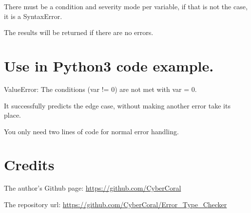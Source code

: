 \documentclass{article}
\begin{document}
 	There must be a condition and severity mode per variable, if that is not the case, it is a SyntaxError.
 	
 	The results will be returned if there are no errors.
 	
 	\newpage
	\section{Use in Python3 code example.}
	
	
	\vspace{3cm}
	\hspace{-0.5cm}ValueError: The conditions (var != 0) are not met with var = 0.
	
	It successfully predicts the edge case, without making another error take its place.
	
	You only need two lines of code for normal error handling.
	
	\label{example}
	
	\section{Credits}
	
	The author's Github page: \href{https://github.com/CyberCoral}{https://github.com/CyberCoral}
	
	\hspace{-0.5cm}The repository url:
	\href{https://github.com/CyberCoral/Error_Type_Checker}{https://github.com/CyberCoral/Error\_Type\_Checker}
	
\end{document}
